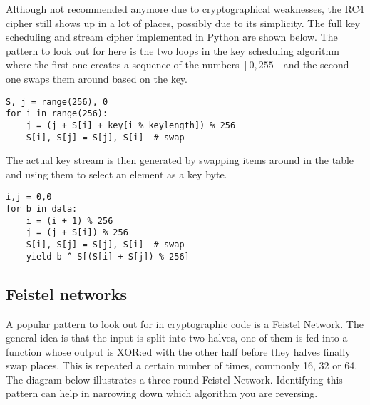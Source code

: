 \documentclass[twocolumn]{article}
\begin{document}
Although not recommended anymore due to cryptographical weaknesses, the RC4 cipher still shows up in a lot of places, possibly due to its simplicity. The full key scheduling and stream cipher implemented in Python are shown below. The pattern to look out for here is the two loops in the key scheduling algorithm where the first one creates a sequence of the numbers $[0,255]$ and the second one swaps them around based on the key.
\vspace*{-0.3\baselineskip}

\begin{verbatim}
S, j = range(256), 0
for i in range(256):
    j = (j + S[i] + key[i % keylength]) % 256
    S[i], S[j] = S[j], S[i]  # swap
\end{verbatim}

The actual key stream is then generated by swapping items around in the table and using them to select an element as a key byte.

\begin{verbatim}
i,j = 0,0
for b in data:
    i = (i + 1) % 256
    j = (j + S[i]) % 256
    S[i], S[j] = S[j], S[i]  # swap
    yield b ^ S[(S[i] + S[j]) % 256]
\end{verbatim}
\vspace*{-2\baselineskip}

\subsection*{Feistel networks}

A popular pattern to look out for in cryptographic code is a Feistel Network. The general idea is that the input is split into two halves, one of them is fed into a function whose output is XOR:ed with the other half before they halves finally swap places. This is repeated a certain number of times, commonly 16, 32 or 64. The diagram below illustrates a three round Feistel Network. Identifying this pattern can help in narrowing down which algorithm you are reversing.

\vspace*{-2\baselineskip}
\end{document}
